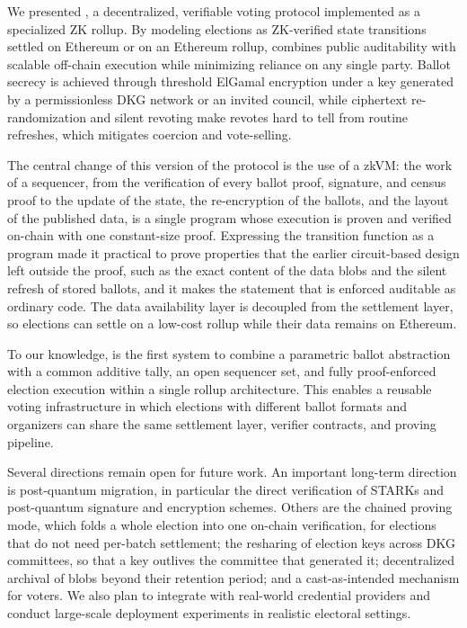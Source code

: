 
We presented \davinci, a decentralized, verifiable voting protocol implemented as a specialized ZK rollup. By modeling elections as ZK-verified state transitions settled on Ethereum or on an Ethereum rollup, \davinci combines public auditability with scalable off-chain execution while minimizing reliance on any single party. Ballot secrecy is achieved through threshold ElGamal encryption under a key generated by a permissionless \ac{DKG} network or an invited council, while ciphertext re-randomization and silent revoting make revotes hard to tell from routine refreshes, which mitigates coercion and vote-selling.

The central change of this version of the protocol is the use of a \ac{zkVM}: the work of a sequencer, from the verification of every ballot proof, signature, and census proof to the update of the state, the re-encryption of the ballots, and the layout of the published data, is a single program whose execution is proven and verified on-chain with one constant-size proof. Expressing the transition function as a program made it practical to prove properties that the earlier circuit-based design left outside the proof, such as the exact content of the data blobs and the silent refresh of stored ballots, and it makes the statement that is enforced auditable as ordinary code. The data availability layer is decoupled from the settlement layer, so elections can settle on a low-cost rollup while their data remains on Ethereum.

To our knowledge, \davinci is the first system to combine a parametric ballot abstraction with a common additive tally, an open sequencer set, and fully proof-enforced election execution within a single rollup architecture. This enables a reusable voting infrastructure in which elections with different ballot formats and organizers can share the same settlement layer, verifier contracts, and proving pipeline.

Several directions remain open for future work. An important long-term direction is post-quantum migration, in particular the direct verification of \acp{STARK} and post-quantum signature and encryption schemes. Others are the chained proving mode, which folds a whole election into one on-chain verification, for elections that do not need per-batch settlement; the resharing of election keys across \ac{DKG} committees, so that a key outlives the committee that generated it; decentralized archival of blobs beyond their retention period; and a cast-as-intended mechanism for voters. We also plan to integrate with real-world credential providers and conduct large-scale deployment experiments in realistic electoral settings.
